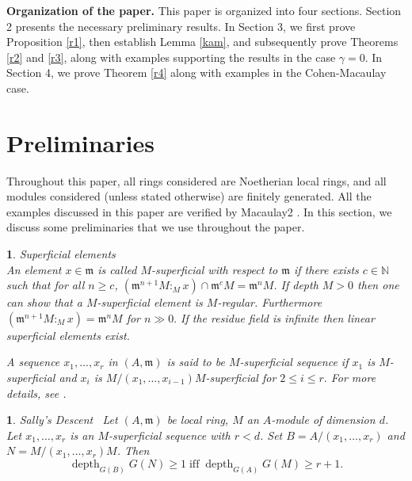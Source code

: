 \documentclass[11pt]{amsart}
\theoremstyle{plain}
\newtheorem{point}[theorem]{}
\newcommand{\m}{\mathfrak{m}}
\newcommand{\N}{\mathbb{N}}
\theoremstyle{plain}
\begin{document}
\textbf{Organization of the paper.} This paper is organized into four sections. Section 2 presents the necessary preliminary results. In Section 3, we first prove Proposition \ref{r1}, then establish Lemma \ref{kam}, and subsequently prove Theorems \ref{r2} and \ref{r3}, along with examples supporting the results in the case $\gamma=0$. In Section 4, we prove Theorem \ref{r4} along with examples in the Cohen-Macaulay case.


\section{Preliminaries}
Throughout this paper, all rings considered are Noetherian local rings, and all modules considered (unless stated otherwise) are finitely generated. All the examples discussed in this paper are verified by Macaulay2 \cite{macaulay2}. In this section, we discuss some preliminaries that we use throughout the paper. 



\begin{point} Superficial elements \\
     \normalfont
   An element $x\in  \m$ is called $M$-superficial with respect to $\m$ if there exists $c\in \N$ such that for all $n \geq c$, $(\m^{n+1}M :_Mx)\cap \m^cM = \m^nM$. If depth $M>0$ then one can show that a $M$-superficial element is $M$-regular. Furthermore $(\m^{n+1}M :_Mx) = \m^nM$ for $n\gg0.$  If the residue field is infinite then linear superficial elements exist.

    A sequence $x_1, \ldots ,x_r$  in $(A, \m)$ is said to be $M$-superficial sequence if $x_1$ is $M$-superficial and $x_i$ is $M/(x_1,\ldots ,x_{i-1})M$-superficial for $2\leq i \leq r .$ For more details, see \cite[Proposition 8.5.7]{HS}.
\end{point}

\begin{point} Sally's Descent \cite[Theorem 8]{HCCMM}\label{sally} 
\normalfont
$\,$ Let $(A,\m)$ be local ring, $M$ an $A$-module of dimension $d$. Let $x_1,\ldots ,x_r$ is an $M$-superficial sequence with $r< d$. Set $B=A/(x_1,\ldots ,x_r)$ and $N=M/(x_1,\ldots ,x_r)M$.
 Then $$\operatorname{depth }_{G(B)}G(N)\geq 1 \operatorname{ iff } \operatorname{depth }_{G(A)}G(M)\geq r+1.$$
\end{point}
\end{document}

